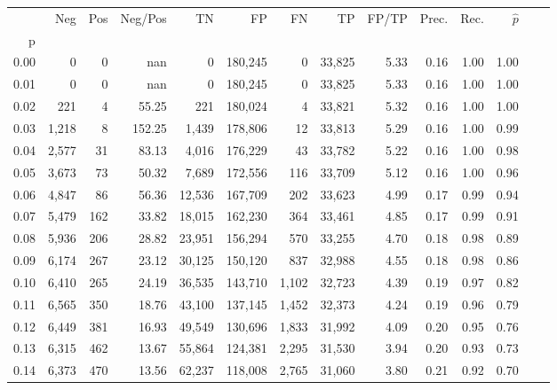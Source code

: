 \begin{tabular}{rrrrrrrrrrrrrr}
\toprule
{} &    Neg &  Pos & Neg/Pos &       TN &       FP &      FN &      TP & FP/TP & Prec. &  Rec. & $\hat{p}$ \\
p    &        &      &         &          &          &         &         &       &       &       &           \\
\midrule
0.00 &      0 &    0 &     nan &        0 &  180,245 &       0 &  33,825 &  5.33 &  0.16 &  1.00 &      1.00 \\
0.01 &      0 &    0 &     nan &        0 &  180,245 &       0 &  33,825 &  5.33 &  0.16 &  1.00 &      1.00 \\
0.02 &    221 &    4 &   55.25 &      221 &  180,024 &       4 &  33,821 &  5.32 &  0.16 &  1.00 &      1.00 \\
0.03 &  1,218 &    8 &  152.25 &    1,439 &  178,806 &      12 &  33,813 &  5.29 &  0.16 &  1.00 &      0.99 \\
0.04 &  2,577 &   31 &   83.13 &    4,016 &  176,229 &      43 &  33,782 &  5.22 &  0.16 &  1.00 &      0.98 \\
0.05 &  3,673 &   73 &   50.32 &    7,689 &  172,556 &     116 &  33,709 &  5.12 &  0.16 &  1.00 &      0.96 \\
0.06 &  4,847 &   86 &   56.36 &   12,536 &  167,709 &     202 &  33,623 &  4.99 &  0.17 &  0.99 &      0.94 \\
0.07 &  5,479 &  162 &   33.82 &   18,015 &  162,230 &     364 &  33,461 &  4.85 &  0.17 &  0.99 &      0.91 \\
0.08 &  5,936 &  206 &   28.82 &   23,951 &  156,294 &     570 &  33,255 &  4.70 &  0.18 &  0.98 &      0.89 \\
0.09 &  6,174 &  267 &   23.12 &   30,125 &  150,120 &     837 &  32,988 &  4.55 &  0.18 &  0.98 &      0.86 \\
0.10 &  6,410 &  265 &   24.19 &   36,535 &  143,710 &   1,102 &  32,723 &  4.39 &  0.19 &  0.97 &      0.82 \\
0.11 &  6,565 &  350 &   18.76 &   43,100 &  137,145 &   1,452 &  32,373 &  4.24 &  0.19 &  0.96 &      0.79 \\
0.12 &  6,449 &  381 &   16.93 &   49,549 &  130,696 &   1,833 &  31,992 &  4.09 &  0.20 &  0.95 &      0.76 \\
0.13 &  6,315 &  462 &   13.67 &   55,864 &  124,381 &   2,295 &  31,530 &  3.94 &  0.20 &  0.93 &      0.73 \\
0.14 &  6,373 &  470 &   13.56 &   62,237 &  118,008 &   2,765 &  31,060 &  3.80 &  0.21 &  0.92 &      0.70 \\

\end{tabular}
